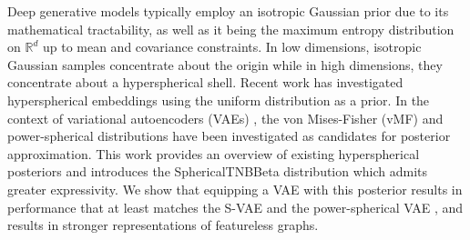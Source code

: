 Deep generative models typically employ an isotropic Gaussian prior due to its mathematical
tractability, as well as it being the maximum entropy distribution on $\mathbb{R}^d$ up to mean
and covariance constraints. In low dimensions, isotropic Gaussian samples concentrate about the origin
while in high dimensions, they concentrate about a hyperspherical shell. Recent work has investigated
hyperspherical embeddings using the uniform distribution as a prior. In the context of variational
autoencoders (VAEs) \citep{kingma2022autoencodingvariationalbayes}, the von Mises-Fisher (vMF) and
power-spherical distributions have been investigated as candidates for posterior approximation. This work
provides an overview of existing hyperspherical posteriors and introduces the SphericalTNBBeta
distribution which admits greater expressivity. We show that equipping a VAE with this posterior
results in performance that at least matches the S-VAE \citep{davidson2022hypersphericalvariationalautoencoders}
and the power-spherical VAE \citep{decao2020powersphericaldistribution}, and results in stronger representations
of featureless graphs.